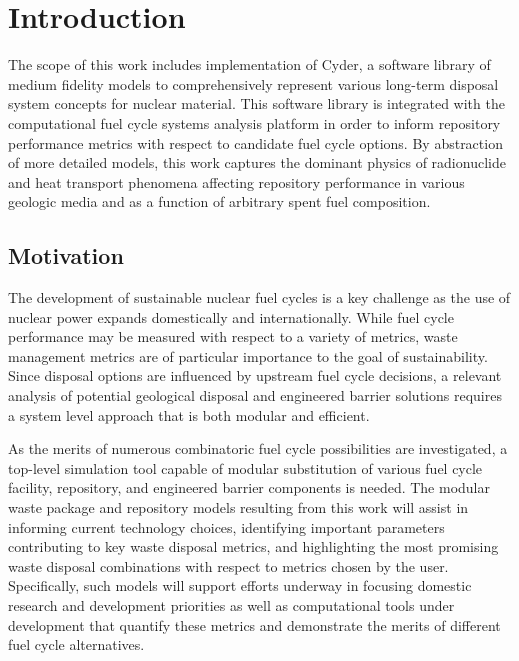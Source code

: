 \chapter{Introduction}\label{ch:introduction}


The scope of this work includes implementation of Cyder, a software library of medium 
fidelity models to comprehensively represent various long-term disposal system 
concepts for nuclear material. This software library is integrated with the 
\Cyclus computational fuel cycle systems analysis platform in order to inform repository 
performance metrics with respect to candidate fuel cycle options. By abstraction 
of more detailed models, this work captures the dominant physics of 
radionuclide and heat transport phenomena affecting repository performance in 
various geologic media and as a function of arbitrary spent fuel composition. 

\section{Motivation} 


The development of sustainable nuclear fuel cycles is a key challenge as the use 
of nuclear power expands domestically and internationally. While fuel cycle 
performance may be measured with respect to a variety of metrics, waste
management metrics are of particular importance to the goal of sustainability. 
Since disposal options are influenced by upstream fuel cycle decisions, a 
relevant analysis of potential geological disposal and engineered barrier 
solutions requires a system level approach that is both modular and efficient. 


As the merits of numerous combinatoric fuel cycle possibilities are 
investigated, a top-level simulation tool capable of modular substitution of 
various fuel cycle facility, repository, and engineered barrier components is 
needed. The modular waste package and repository models resulting from this work 
will assist in informing current technology choices, identifying important 
parameters contributing to key waste disposal metrics, and highlighting the most 
promising waste disposal combinations with respect to metrics chosen by
the user. Specifically, such models will support efforts underway in focusing 
domestic research and development priorities as well as computational tools 
under development that quantify these metrics and demonstrate the merits of 
different fuel cycle alternatives. 

